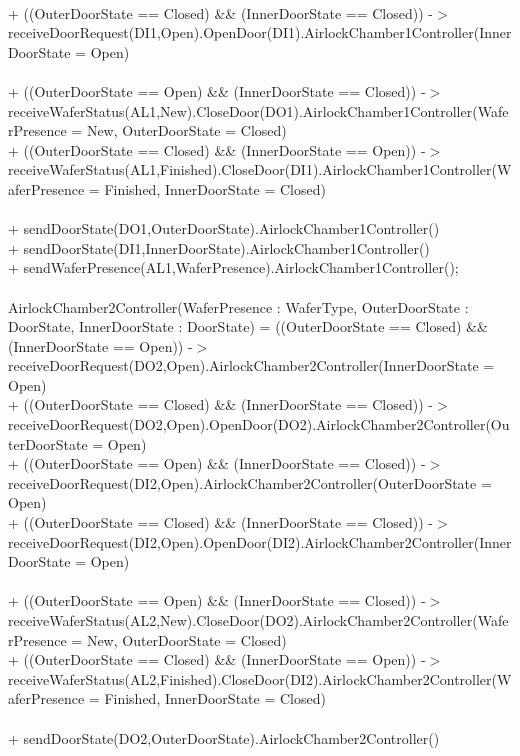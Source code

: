 \documentclass[a4paper,12pt]{article}
\begin{document}
\\+ ((OuterDoorState == Closed) \&\& (InnerDoorState == Closed)) -$>$ receiveDoorRequest(DI1,Open).OpenDoor(DI1).AirlockChamber1Controller(InnerDoorState = Open)
\\
\\+ ((OuterDoorState == Open) \&\& (InnerDoorState == Closed)) -$>$ receiveWaferStatus(AL1,New).CloseDoor(DO1).AirlockChamber1Controller(WaferPresence = New, OuterDoorState = Closed)
\\+ ((OuterDoorState == Closed) \&\& (InnerDoorState == Open)) -$>$ receiveWaferStatus(AL1,Finished).CloseDoor(DI1).AirlockChamber1Controller(WaferPresence = Finished, InnerDoorState = Closed)
\\
\\+ sendDoorState(DO1,OuterDoorState).AirlockChamber1Controller()
\\+ sendDoorState(DI1,InnerDoorState).AirlockChamber1Controller()
\\+ sendWaferPresence(AL1,WaferPresence).AirlockChamber1Controller();
\\
\\AirlockChamber2Controller(WaferPresence : WaferType, OuterDoorState : DoorState, InnerDoorState : DoorState) =
((OuterDoorState == Closed) \&\& (InnerDoorState == Open)) -$>$ receiveDoorRequest(DO2,Open).AirlockChamber2Controller(InnerDoorState = Open)
\\+ ((OuterDoorState == Closed) \&\& (InnerDoorState == Closed)) -$>$ receiveDoorRequest(DO2,Open).OpenDoor(DO2).AirlockChamber2Controller(OuterDoorState = Open)
\\+ ((OuterDoorState == Open) \&\& (InnerDoorState == Closed)) -$>$ receiveDoorRequest(DI2,Open).AirlockChamber2Controller(OuterDoorState = Open)
\\+ ((OuterDoorState == Closed) \&\& (InnerDoorState == Closed)) -$>$ receiveDoorRequest(DI2,Open).OpenDoor(DI2).AirlockChamber2Controller(InnerDoorState = Open)
\\
\\+ ((OuterDoorState == Open) \&\& (InnerDoorState == Closed)) -$>$ receiveWaferStatus(AL2,New).CloseDoor(DO2).AirlockChamber2Controller(WaferPresence = New, OuterDoorState = Closed)
\\+ ((OuterDoorState == Closed) \&\& (InnerDoorState == Open)) -$>$ receiveWaferStatus(AL2,Finished).CloseDoor(DI2).AirlockChamber2Controller(WaferPresence = Finished, InnerDoorState = Closed)
\\
\\+ sendDoorState(DO2,OuterDoorState).AirlockChamber2Controller()
\end{document}
